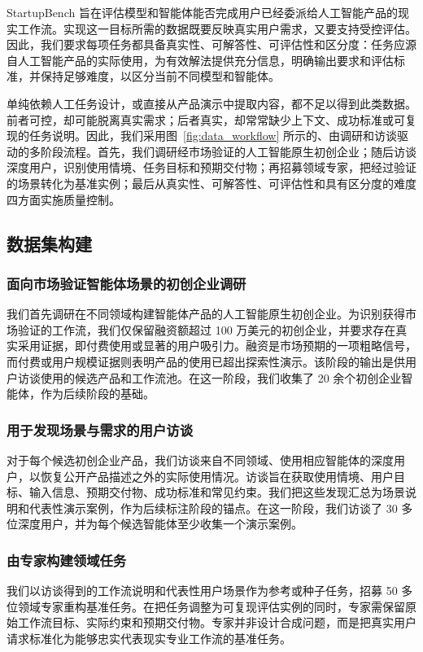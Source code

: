 StartupBench 旨在评估模型和智能体能否完成用户已经委派给人工智能产品的现实工作流。实现这一目标所需的数据既要反映真实用户需求，又要支持受控评估。因此，我们要求每项任务都具备真实性、可解答性、可评估性和区分度：任务应源自人工智能产品的实际使用，为有效解法提供充分信息，明确输出要求和评估标准，并保持足够难度，以区分当前不同模型和智能体。

单纯依赖人工任务设计，或直接从产品演示中提取内容，都不足以得到此类数据。前者可控，却可能脱离真实需求；后者真实，却常常缺少上下文、成功标准或可复现的任务说明。因此，我们采用图~\ref{fig:data_workflow} 所示的、由调研和访谈驱动的多阶段流程。首先，我们调研经市场验证的人工智能原生初创企业；随后访谈深度用户，识别使用情境、任务目标和预期交付物；再招募领域专家，把经过验证的场景转化为基准实例；最后从真实性、可解答性、可评估性和具有区分度的难度四方面实施质量控制。

\subsection{数据集构建}

\subsubsection{面向市场验证智能体场景的初创企业调研}
我们首先调研在不同领域构建智能体产品的人工智能原生初创企业。为识别获得市场验证的工作流，我们仅保留融资额超过 100 万美元的初创企业，并要求存在真实采用证据，即付费使用或显著的用户吸引力。融资是市场预期的一项粗略信号，而付费或用户规模证据则表明产品的使用已超出探索性演示。该阶段的输出是供用户访谈使用的候选产品和工作流池。在这一阶段，我们收集了 20 余个初创企业智能体，作为后续阶段的基础。

\subsubsection{用于发现场景与需求的用户访谈}
对于每个候选初创企业产品，我们访谈来自不同领域、使用相应智能体的深度用户，以恢复公开产品描述之外的实际使用情况。访谈旨在获取使用情境、用户目标、输入信息、预期交付物、成功标准和常见约束。我们把这些发现汇总为场景说明和代表性演示案例，作为后续标注阶段的锚点。在这一阶段，我们访谈了 30 多位深度用户，并为每个候选智能体至少收集一个演示案例。

\subsubsection{由专家构建领域任务}
我们以访谈得到的工作流说明和代表性用户场景作为参考或种子任务，招募 50 多位领域专家重构基准任务。在把任务调整为可复现评估实例的同时，专家需保留原始工作流目标、实际约束和预期交付物。专家并非设计合成问题，而是把真实用户请求标准化为能够忠实代表现实专业工作流的基准任务。

